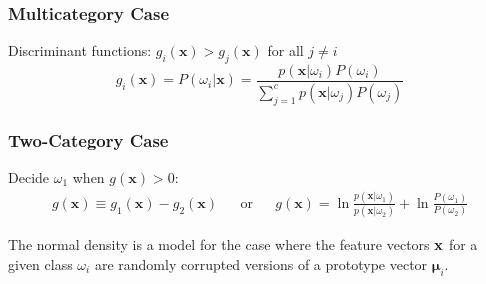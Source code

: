 \begin{multicols}{2}
    \subsubsection{Multicategory Case}
    Discriminant functions: $g_i(\mathbf{x}) > g_j(\mathbf{x})$ for all $j \neq i$
    $$g_i(\mathbf{x}) = P(\omega_i|\mathbf{x}) = 
    \frac{p(\mathbf{x}|\omega_i) P(\omega_i)}{\sum\limits_{j=1}^{c}p(\mathbf{x}|\omega_j) P(\omega_j)}$$
    
    \subsubsection{Two-Category Case}
    Decide $\omega_1$ when $g(\mathbf{x}) > 0$:
    \begin{align*}
        g(\mathbf{x}) \equiv g_1(\mathbf{x}) - g_2(\mathbf{x})
        &&\text{or}&&
        g(\mathbf{x}) = \ln \frac{p(\mathbf{x}|\omega_1)}{p(\mathbf{x}|\omega_2)} + \ln \frac{P(\omega_1)}{P(\omega_2)} 
    \end{align*}
\end{multicols}

  The normal density is a model for the case where the feature vectors $\mathbf{x}$ for a given class $\omega_i$ are randomly corrupted versions of a prototype vector $\boldsymbol{\mu}_i$.
  
